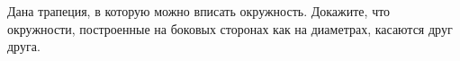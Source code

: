\begin{ex}
	\begin{condition}
		Дана трапеция, в которую можно вписать окружность. Докажите, что окружности, построенные на боковых	сторонах как на диаметрах, касаются друг друга.
	\end{condition}
\end{ex}